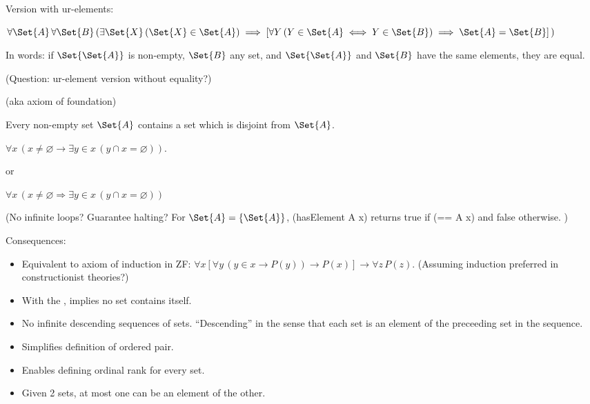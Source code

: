Version with ur-elements:

$\forall \Set{A}\,
\forall \Set{B}\,
(\exists \Set{X}\,(\Set{X}\in \Set{A})
\implies
 [\forall Y\,
 (Y\in \Set{A}
 \iff 
 Y\in \Set{B}) \implies \Set{A}=\Set{B}]\,)$
 
In words: 
if $\Set{\Set{A}}$ is non-empty, $\Set{B}$ any set, 
and $\Set{\Set{A}}$ and $\Set{B}$ have the same
elements, they are equal.

(Question: ur-element version without equality?)


(aka axiom of foundation)~\cite{wiki:Axiom_of_regularity}

Every non-empty set $\Set{A}$ contains a set which is disjoint from $\Set{A}$.

$\forall x\,(x \neq \varnothing
\rightarrow 
\exists y\in x\,(y\cap x=\varnothing ))$.
 
or
 
$\forall x\,(x\neq \varnothing \Rightarrow 
 \exists y\in x\,(y\cap x=\varnothing ))$
 
(No infinite loops? Guarantee halting? 
For $\Set{A} = \{\Set{A}\}$,
\textsf{(hasElement A x)} 
returns \textsf{true} if \textsf{(== A x)}
and \textsf{false} otherwise. )

Consequences:
\begin{itemize}
\item 
Equivalent to axiom of induction\cite{wiki:Epsilon-induction} 
in \textsf{ZF}:
$\forall x
[\forall y\,(y\in x\rightarrow P(y))\rightarrow P(x)]
\rightarrow \forall z\,P(z)$.
(Assuming induction preferred in constructionist theories?)

\item With the , 
implies no set contains itself.

\item No infinite descending sequences of sets.
``Descending'' in the sense that each set is an element of the
preceeding set in the sequence.

\item Simplifies definition of ordered pair.

\item Enables defining ordinal rank for every set.

\item Given 2 sets, at most one can be an element of the other.
\end{itemize}


